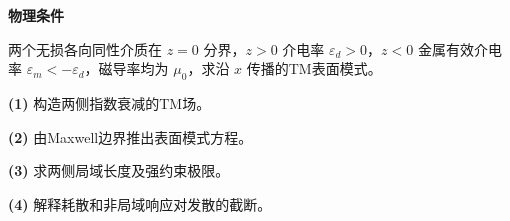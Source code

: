 \textbf{物理条件}\par 两个无损各向同性介质在 \(z=0\) 分界，\(z>0\) 介电率 \(\varepsilon_d>0\)，\(z<0\) 金属有效介电率 \(\varepsilon_m<-\varepsilon_d\)，磁导率均为 \(\mu_0\)，求沿 \(x\) 传播的TM表面模式。
\par\noindent\textbf{(1)} 构造两侧指数衰减的TM场。
\par\noindent\textbf{(2)} 由Maxwell边界推出表面模式方程。
\par\noindent\textbf{(3)} 求两侧局域长度及强约束极限。
\par\noindent\textbf{(4)} 解释耗散和非局域响应对发散的截断。
